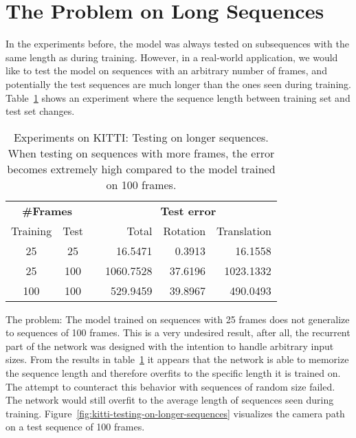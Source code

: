 	\section{The Problem on Long Sequences}
		In the experiments before, the model was always tested on subsequences with the same length as during training.
		However, in a real-world application, we would like to test the model on sequences with an arbitrary number of frames, and potentially the test sequences are much longer than the ones seen during training.
		Table~\ref{tbl:kitti-testing-on-longer-sequences} shows an experiment where the sequence length between training set and test set changes.
		\begin{table}[tb]
			\small
			\begin{center}
				\begin{tabular}{cccrrr}
					\toprule
					\multicolumn{2}{c}{\textbf{\#Frames}}	&	& \multicolumn{3}{c}{\textbf{Test error}} \\ 
					\cmidrule(lr){1-2} 									\cmidrule(lr){4-6}
					Training 		& Test 			&	& Total 	& Rotation	& Translation	\\ 
					\midrule
					25				& 25			&	& 16.5471	& 0.3913	& 16.1558		\\
					25				& 100			&	& 1060.7528	& 37.6196	& 1023.1332		\\
					100				& 100			&	& 529.9459	& 39.8967	& 490.0493		\\ 
					\bottomrule
				\end{tabular}
			\end{center}
			\caption[Experiments on KITTI: Testing on longer sequences]
					{Experiments on KITTI: Testing on longer sequences. 
					 When testing on sequences with more frames, the error becomes extremely high compared to the model trained on 100 frames.
				 \label{tbl:kitti-testing-on-longer-sequences}}
		\end{table}
		The problem: The model trained on sequences with 25 frames does not generalize to sequences of 100 frames.
		This is a very undesired result, after all, the recurrent part of the network was designed with the intention to handle arbitrary input sizes.
		From the results in table~\ref{tbl:kitti-testing-on-longer-sequences} it appears that the network is able to memorize the sequence length and therefore overfits to the specific length it is trained on.
		The attempt to counteract this behavior with sequences of random size failed.
		The network would still overfit to the average length of sequences seen during training.
		Figure~\ref{fig:kitti-testing-on-longer-sequences} visualizes the camera path on a test sequence of 100 frames.
